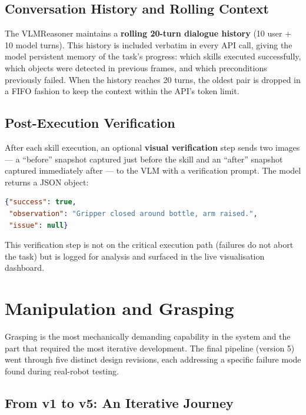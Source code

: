 \subsection{Conversation History and Rolling Context}

The VLMReasoner maintains a \textbf{rolling 20-turn dialogue history}
(10 user + 10 model turns).
This history is included verbatim in every API call, giving the model
persistent memory of the task's progress: which skills executed successfully,
which objects were detected in previous frames, and which preconditions
previously failed.
When the history reaches 20 turns, the oldest pair is dropped in a FIFO
fashion to keep the context within the API's token limit.

\subsection{Post-Execution Verification}

After each skill execution, an optional \textbf{visual verification} step
sends two images --- a ``before'' snapshot captured just before the skill
and an ``after'' snapshot captured immediately after --- to the VLM with
a verification prompt.
The model returns a JSON object:
\begin{lstlisting}[language=JSON, numbers=none]
{"success": true,
 "observation": "Gripper closed around bottle, arm raised.",
 "issue": null}
\end{lstlisting}

This verification step is not on the critical execution path (failures do not
abort the task) but is logged for analysis and surfaced in the live
visualisation dashboard.

\section{Manipulation and Grasping}
\label{sec:manipulation}

Grasping is the most mechanically demanding capability in the system and the
part that required the most iterative development.
The final pipeline (version 5) went through five distinct design revisions,
each addressing a specific failure mode found during real-robot testing.

\subsection{From v1 to v5: An Iterative Journey}

